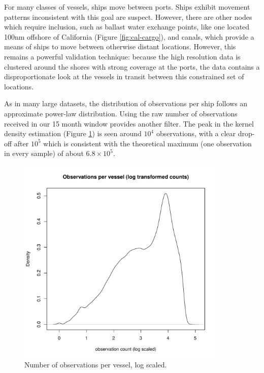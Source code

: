 For many classes of vessels, ships move between ports. Ships exhibit movement patterns inconsistent with this goal are suspect. However, there are other nodes which require inclusion, such as ballast water exchange points, like one located 100nm offshore of California (Figure \ref{fig:cal-cargo}), and canals, which provide a means of ships to move between otherwise distant locations. However, this remains a powerful validation technique: because the high resolution data is clustered around the shores with strong coverage at the ports, the data contains a disproportionate look at the vessels in transit between this constrained set of locations.

As in many large datasets, the distribution of observations per ship follows an approximate power-law distribution. Using the raw number of observations received in our 15 month window provides another filter. The peak in the kernel density estimation (Figure \ref{fig:obs-per-vessel-log}) is seen around $10^4$ observations, with a clear drop-off after $10^5$ which is consistent with the theoretical maximum (one observation in every sample) of about $6.8 \times 10^5$.

\begin{figure}[htbp]
  \centering
  \includegraphics[width=100mm]{figures/obs-per-vessel-log.pdf}
  \caption{Number of observations per vessel, log scaled.}
  \label{fig:obs-per-vessel-log}
\end{figure}



